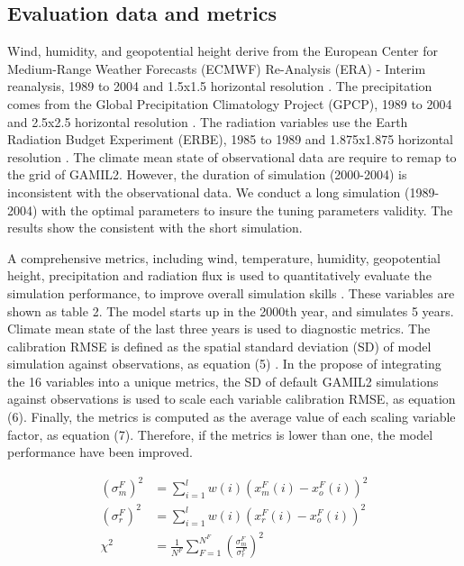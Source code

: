 \documentclass[gmd, manuscript]{copernicus}
\begin{document}
\subsection{Evaluation data and metrics}

Wind, humidity, and geopotential height derive from the European Center for Medium-Range
Weather Forecasts (ECMWF) Re-Analysis (ERA) - Interim reanalysis, 1989 to 2004 and 1.5x1.5
horizontal resolution \citep{simmons2007era}. The precipitation comes from the Global Precipitation
Climatology Project (GPCP), 1989 to 2004 and 2.5x2.5 horizontal resolution \citep{adler2003version}
. The radiation variables use the Earth Radiation Budget Experiment (ERBE), 1985 to 1989  and
1.875x1.875 horizontal resolution \citep{barkstrom1984earth}. The climate mean state of
observational data are require to  remap to the grid of GAMIL2. However, the duration of simulation
(2000-2004)  is inconsistent with the observational data. We conduct a long simulation (1989-2004)
with the optimal parameters to insure the tuning parameters validity. The results show the
consistent with the short simulation.

A comprehensive metrics, including wind, temperature, humidity, geopotential height, precipitation
and radiation flux is used to quantitatively evaluate the simulation performance, to improve
overall simulation skills \citep{murphy2004quantification,gleckler2008performance,reichler2008well}
. These variables are shown as table 2. The model starts up in the 2000th year, and simulates 5
years. Climate mean state of the last three years is used to diagnostic metrics. The
calibration RMSE is defined as the spatial standard deviation (SD) of model simulation against
observations, as equation (5) \citep{taylor2001summarizing,yang2013uncertainty}. In the propose  of
integrating the 16 variables into a unique metrics, the SD of default GAMIL2  simulations against
observations is used to scale each variable calibration RMSE, as equation (6). Finally, the 
metrics is computed as the average value of each scaling variable factor, as equation (7). 
Therefore, if the metrics is lower than one, the model performance have been improved.

\begin{align}
(\sigma_m^F)^2 &= \sum_{i=1}^l w(i)(x_m^F(i) - x_o^F(i))^2 \\
(\sigma_r^F)^2 &= \sum_{i=1}^l w(i)(x_r^F(i) - x_o^F(i))^2 \\
\chi^2 &= \frac{1}{N^F}\sum_{F=1}^{N^F} (\frac{\sigma_m^F}{\sigma_r^F})^2
\end{align}
\end{document}
